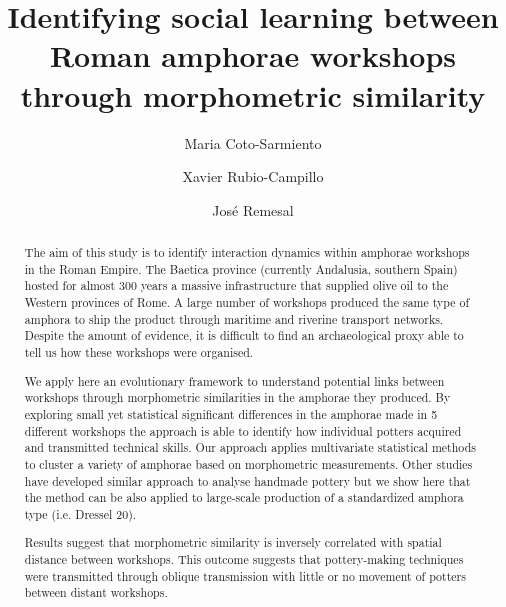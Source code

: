 \documentclass[review]{elsarticle}
\begin{document}
\begin{frontmatter}

\title{Identifying social learning between Roman amphorae workshops through morphometric similarity}


\author[bscadress,ceipacadress]{Maria Coto-Sarmiento}


\author[edadress]{Xavier Rubio-Campillo}
\author[ceipacadress]{Jos\'e Remesal}


\address[bscadress]{Barcelona Supercomputing Center (BSC), Jordi Girona 29, Office 3A, Nexus II Building, 08034, Barcelona, Spain}
\address[edadress]{School of History, Classic \& Archaeology, Room OOM.33, William Robertson Wing, Old Medical School, Teviot Place, University of Edinburgh, UK}
\address[ceipacadress]{CEIPAC, Department of Prehistory and Archaeology, Montalegre, 6-8, 08001, University of Barcelona, Barcelona, Spain}

\begin{abstract}

The aim of this study is to identify interaction dynamics within amphorae workshops in the Roman Empire. The Baetica province (currently Andalusia, southern Spain) hosted for almost 300 years a massive infrastructure that supplied olive oil to the Western provinces of Rome. A large number of workshops produced the same type of amphora to ship the product through maritime and riverine transport networks. Despite the amount of evidence,  it is difficult to find an archaeological proxy able to tell us how these workshops were organised.

We apply here an evolutionary framework to understand potential links between workshops through morphometric similarities in the amphorae they produced. By exploring small yet statistical significant differences in the amphorae made in 5 different workshops the approach is able to identify how individual potters acquired and transmitted technical skills.  Our approach applies multivariate statistical methods to cluster a variety of amphorae based on morphometric measurements. Other studies have developed similar approach to analyse handmade pottery but we show here that the method can be also applied to large-scale production of a standardized amphora type (i.e. Dressel 20).

Results suggest that morphometric similarity is inversely correlated with spatial distance between workshops. This outcome suggests that pottery-making techniques were transmitted through oblique transmission with little or no movement of potters between distant workshops.


\end{abstract}
\end{frontmatter}
\end{document}
